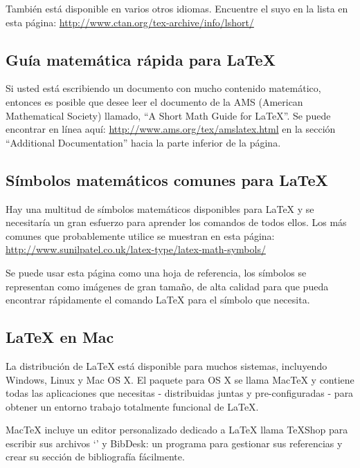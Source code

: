 También está disponible en varios otros idiomas. Encuentre el suyo en la lista en esta página: \url{http://www.ctan.org/tex-archive/info/lshort/}


\subsection{Guía matemática rápida para \LaTeX{}}

Si usted está escribiendo un documento con mucho contenido matemático, entonces es posible que desee leer el documento de la AMS (American Mathematical Society) llamado, \enquote{A Short Math Guide for \LaTeX{}}. Se puede encontrar en línea aquí: \url{http://www.ams.org/tex/amslatex.html} en la sección \enquote{Additional Documentation} hacia la parte inferior de la página.

\subsection{Símbolos matemáticos comunes para \LaTeX{}}

Hay una multitud de símbolos matemáticos disponibles para \LaTeX{} y se necesitaría un gran esfuerzo para aprender los comandos de todos ellos. Los más comunes que probablemente utilice se muestran en esta página:
\url{http://www.sunilpatel.co.uk/latex-type/latex-math-symbols/}

Se puede usar esta página como una hoja de referencia, los símbolos se representan como imágenes de gran tamaño, de alta calidad para que pueda encontrar rápidamente el comando \LaTeX{} para el símbolo que necesita.

\subsection{\LaTeX{} en Mac}

La distribución de \LaTeX {} está disponible para muchos sistemas, incluyendo Windows, Linux y Mac OS X. El paquete para OS X se llama MacTeX y contiene todas las aplicaciones que necesitas - distribuidas juntas y pre-configuradas - para obtener un entorno trabajo totalmente funcional de \LaTeX{}.
 
MacTeX incluye un editor personalizado dedicado a \LaTeX {} llama TeXShop para escribir sus archivos `' y BibDesk: un programa para gestionar sus referencias y crear su sección de bibliografía fácilmente.
 

